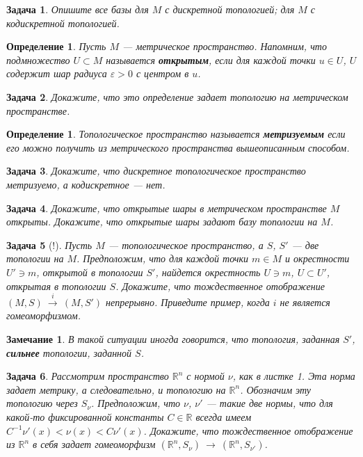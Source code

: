 \documentclass[12pt]{book}
\newcommand{\arrow}{{\:\longrightarrow\:}}
\renewcommand{\epsilon}{\varepsilon}
\def\R{{\mathbb R}}
\theoremstyle{upshape}
\newtheorem{zadacha}{Задача}[chapter]
\theoremstyle{generic}
\newtheorem{opredelenie}[teorema]{Определение}
\theoremstyle{upshapenonumber}
\newtheorem{zamechanie}{Замечание}[chapter]
\newcommand{\следствие}{%
     \refstepcounter{teorema}
     {\noindent\bf Следствие \thechapter.\arabic{teorema}:\ }}
\newcommand{\пример}{%
     \refstepcounter{teorema}
     {\noindent\bf Пример \thechapter.\arabic{teorema}:\ }}
\newcommand{\лемма}{%
     \refstepcounter{teorema}
     {\noindent\bf Лемма \thechapter.\arabic{teorema}:\ }}
\newcommand{\теорема}{%
     \refstepcounter{teorema}
     {\noindent\bf Теорема \thechapter.\arabic{teorema}:\ }}
\newcommand{\утверждение}{%
     \refstepcounter{teorema}
     {\noindent\bf Утверждение \thechapter.\arabic{teorema}:\ }}
\begin{document}
{\begin{zadacha}
Опишите все базы для $M$ с дискретной топологией; для $M$ с
кодискретной топологией.
\end{zadacha}

\begin{opredelenie}
Пусть $M$ --- метрическое пространство.  Напомним, что подмножество
$U\subset M$ называется {\bf открытым}, если для каждой точки $u\in
U$, $U$ содержит шар радиуса $\epsilon >0$ с центром в $u$.
\end{opredelenie}

\begin{zadacha} 
Докажите, что это определение задает топологию на метрическом
пространстве.
\end{zadacha}

\begin{opredelenie}
Топологическое пространство называется {\bf метризуемым} если 
его можно получить из метрического пространства вышеописанным способом.
\end{opredelenie}

\begin{zadacha} 
Докажите, что дискретное топологическое пространство метризуемо, а
кодискретное --- нет.
\end{zadacha}

\begin{zadacha} 
Докажите, что открытые шары в метрическом пространстве $M$ открыты.
Докажите, что открытые шары задают базу топологии на $M$.
\end{zadacha}

\begin{zadacha}[!]
Пусть $M$ --- топологическое пространство, а $S$, $S'$ --- две
топологии на $M$.  Предположим, что для каждой точки $m\in M$ и
окрестности $U'\ni m$, открытой в топологии $S'$, найдется окрестность
$U\ni m$, $U\subset U'$, открытая в топологии $S$. Докажите, что
тождественное отображение $(M, S) \overset{i}{\arrow} (M, S')$
непрерывно. Приведите пример, когда  $i$ не является
гомеоморфизмом.
\end{zadacha}

\begin{zamechanie}
В такой ситуации иногда говорится, что топология, заданная
$S'$, {\bf сильнее} топологии, заданной $S$. 
\end{zamechanie}

\begin{zadacha}  
Рассмотрим пространство $\R^n$ с нормой $\nu$, как в
листке 1. Эта норма задает метрику, а следовательно, и топологию
на $\R^n$. Обозначим эту топологию через $S_\nu$. Предположим, что
$\nu$, $\nu'$ --- такие две нормы, что для какой-то фиксированной
константы $C\in \R$ всегда имеем $C^{-1} \nu'(x) <\nu(x)< C
\nu'(x)$. Докажите, что тождественное отображение из $\R^n$ в себя
задает гомеоморфизм $(\R^n, S_\nu)\arrow (\R^n, S_{\nu'})$.
\end{zadacha}

}
\end{document}
